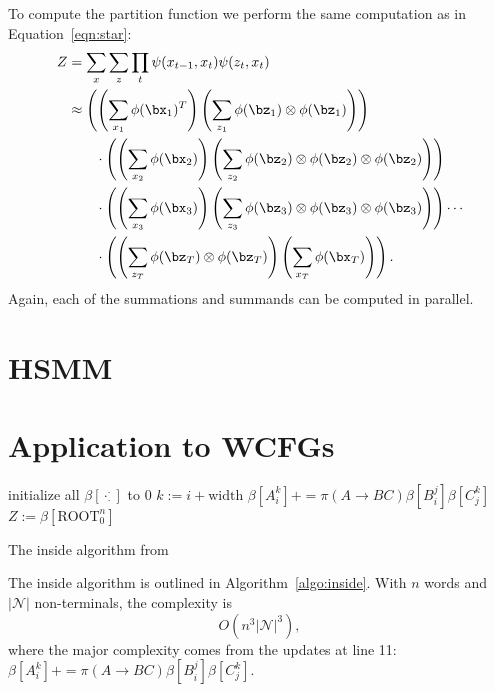 \documentclass{article}
\begin{document}
To compute the partition function we perform the same computation
as in Equation~\ref{eqn:star}:
\begin{equation}
\begin{aligned}
Z &= \sum_x\sum_z \prod_t \psi(x_{t-1}, x_t)\psi(z_t, x_t)\\
&\approx
\left(\left(\sum_{x_1} \phi(\bx_1)^T \right) \left(\sum_{z_1} \phi(\bz_1)\otimes \phi(\bz_1) \right)\right)\\
&\qquad \cdot \left(\left(\sum_{x_2} \phi(\bx_2) \right) \left(\sum_{z_2} \phi(\bz_2)\otimes \phi(\bz_2)\otimes\phi(\bz_2) \right)\right)\\
&\qquad \cdot \left(\left(\sum_{x_3} \phi(\bx_3) \right) \left(\sum_{z_3} \phi(\bz_3)\otimes \phi(\bz_3)\otimes\phi(\bz_3) \right)\right)
\cdots\\
&\qquad \cdot \left(\left(\sum_{z_T} \phi(\bz_T)\otimes \phi(\bz_T) \right)\left(\sum_{x_T} \phi(\bx_T) \right) \right).
\end{aligned}
\end{equation}
Again, each of the summations and summands can be computed in parallel.

\section{HSMM}

\section{Application to WCFGs}
\begin{algorithm}[H]
  \begin{algorithmic}[1]
      \State initialize all $\beta[\cdot_\cdot^\cdot]$ to 0
       
           
        \EndFor    
    \EndFor
     
       
        \State $k := i + \text{width}$ 
         
            \State $\beta [A_{i}^k]+ = \pi (A \to B C) \beta[B_i^j] \beta[C_j^k]$
          \EndFor
        \EndFor
      \EndFor
    \EndFor
    \State\Return $Z:=\beta[\text{ROOT}_0^n]$ 
    \EndFunction
  \end{algorithmic}
  \caption{\label{algo:inside}The inside algorithm from \cite{eisner2016inside}}
\end{algorithm}
The inside algorithm is outlined in Algorithm~\ref{algo:inside}. With $n$ words and $|\mathcal{N}|$ non-terminals, the complexity is
\begin{equation}
    O(n^3 |\mathcal{N}|^3),
\end{equation}
where the major complexity comes from the updates at line 11: $\beta [A_{i}^k]+ = \pi (A \to B C) \beta[B_i^j] \beta[C_j^k]$.
\end{document}
